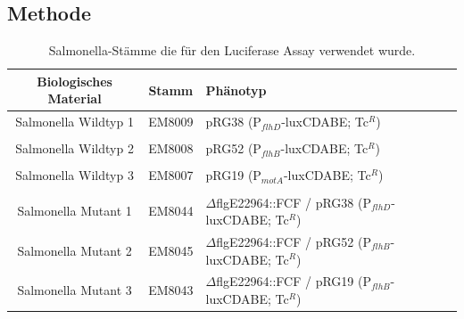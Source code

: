 \documentclass[oneside,10pt,a4paper]{report}
\begin{document}
			\subsection{Methode}
				\begin{table}[H]
				\centering
				\caption{Salmonella-Stämme die für den Luciferase Assay verwendet wurde.}
				\label{tab: exp6-biologisches Material part2}
				\begin{tabular}{ccp{7.5cm}}
					\toprule
					Biologisches Material& Stamm & Phänotyp\\
					\midrule
					\multirow{2}{*}{\parbox[t]{2cm}{Salmonella Wildtyp 1 }}  & \multirow{2}{*}{EM8009} & \multirow{2}{*}{\parbox[t]{7.5cm}{pRG38 (P$_{flhD}$-luxCDABE; Tc$^R$)}}\\
					&&\\
					&&\\
					\multirow{2}{*}{\parbox[t]{2cm}{Salmonella Wildtyp 2}}  & \multirow{2}{*}{EM8008} & \multirow{2}{*}{\parbox[t]{7.5cm}{pRG52 (P$_{flhB}$-luxCDABE; Tc$^R$)}}\\
					&&\\
					&&\\
					\multirow{2}{*}{\parbox[t]{2cm}{Salmonella Wildtyp 3}}  & \multirow{2}{*}{EM8007} & \multirow{2}{*}{\parbox[t]{7.5cm}{pRG19 (P$_{motA}$-luxCDABE; Tc$^R$)}}\\
					&&\\
					&&\\
					\multirow{3}{*}{\parbox[t]{2cm}{Salmonella Mutant 1}} & \multirow{3}{*}{EM8044} &\multirow{3}{*}{\parbox[t]{7.5cm}{$\Delta$flgE22964::FCF / pRG38 (P$_{flhD}$-luxCDABE; Tc$^R$)}} \\
					&&\\
					&&\\
					\multirow{3}{*}{\parbox[t]{2cm}{Salmonella Mutant 2}} & \multirow{3}{*}{EM8045} &\multirow{3}{*}{\parbox[t]{7.5cm}{$\Delta$flgE22964::FCF / pRG52 (P$_{flhB}$-luxCDABE; Tc$^R$)}} \\
					&&\\
					&&\\
					\multirow{3}{*}{\parbox[t]{2cm}{Salmonella Mutant 3}} & \multirow{3}{*}{EM8043} &\multirow{3}{*}{\parbox[t]{7.5cm}{$\Delta$flgE22964::FCF / pRG19 (P$_{flhB}$-luxCDABE; Tc$^R$)}} \\
					&&\\
					&&\\
					
					\bottomrule			
				\end{tabular}
			\end{table}
			
\end{document}
